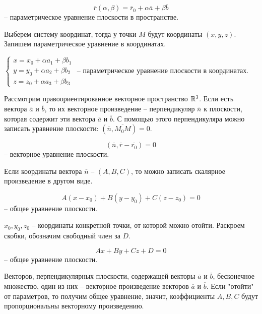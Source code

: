 	\begin{Def}
		$$\overline{r} (\alpha, \beta) = \overline{r}_0 + \alpha \overline{a} + \beta \overline{b}$$ -- параметрическое уравнение плоскости в пространстве.
	\end{Def}

	Выберем систему координат, тогда у точки $M$ будут координаты $(x, y, z)$. Запишем параметрическое уравнение в координатах.

	\begin{Def}
		$ \begin{cases}
			x = x_0 + \alpha a_1 +  \beta b_1\\
			y = y_0 + \alpha a_2 + \beta b_2 \\
			z = z_0 + \alpha a_3 + \beta b_3
		\end{cases} $ -- параметрическое уравнение плоскости в координатах.
	\end{Def}

	Рассмотрим правоориентированное векторное пространство $\mathbb{R}^3$. Если есть вектора $\overline{a}$ и $\overline{b}$, то их векторное произведение -- перпендикуляр $\overline{n}$ к плоскости, которая содержит эти вектора $\overline{a}$ и $\overline{b}$. С помощью этого перпендикуляра можно записать уравнение плоскости: $(\overline{n}, \overline{M_0M}) = 0$.

	\begin{Def}
		$$(\overline{n}, \overline{r} - \overline{r_0}) = 0$$ -- векторное уравнение плоскости.
	\end{Def}

	\begin{figure}[h]
		\centering
		\def\svgwidth{0.5\columnwidth}
		
	\end{figure}

	Если координаты вектора $\overline{n}$ -- $(A, B, C)$, то можно записать скалярное произведение в другом виде.

	\begin{Def}
		$$A(x- x_0) + B(y - y_0) + C(z - z_0) = 0$$ -- общее уравнение плоскости.
	\end{Def}

	$x_0,  y_0, z_0$ -- координаты конкретной точки, от которой можно отойти. Раскроем скобки, обозначим свободный член за $D$.
	
	\begin{Def}
		$$Ax + By + Cz + D = 0$$ -- общее уравнение плоскости.
	\end{Def}

	Векторов, перпендикулярных плоскости, содержащей векторы $\overline{a}$ и $\overline{b}$, бесконечное множество, один из них -- векторное произведение векторов $\overline{a}$ и $\overline{b}$. Если "отойти"  от параметров, то получим общее уравнение, значит, коэффициенты $A, B, C$ будут пропорциональны векторному произведению.  

